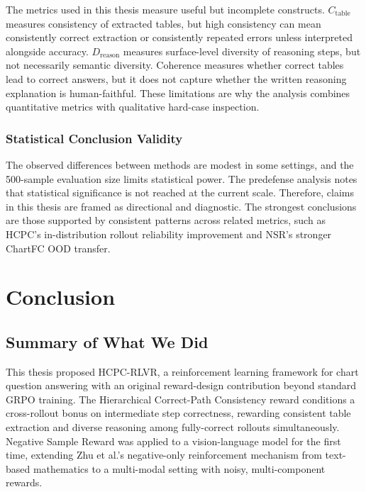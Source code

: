 \documentclass{iutbscthesis}
\begin{document}
The metrics used in this thesis measure useful but incomplete constructs. $C_{\text{table}}$ measures consistency of extracted tables, but high consistency can mean consistently correct extraction or consistently repeated errors unless interpreted alongside accuracy. $D_{\text{reason}}$ measures surface-level diversity of reasoning steps, but not necessarily semantic diversity. Coherence measures whether correct tables lead to correct answers, but it does not capture whether the written reasoning explanation is human-faithful. These limitations are why the analysis combines quantitative metrics with qualitative hard-case inspection.

\subsection{Statistical Conclusion Validity}

The observed differences between methods are modest in some settings, and the 500-sample evaluation size limits statistical power. The predefense analysis notes that statistical significance is not reached at the current scale. Therefore, claims in this thesis are framed as directional and diagnostic. The strongest conclusions are those supported by consistent patterns across related metrics, such as HCPC's in-distribution rollout reliability improvement and NSR's stronger ChartFC OOD transfer.


\chapter{Conclusion} \label{chapter:conclusion}

\section{Summary of What We Did}

This thesis proposed HCPC-RLVR, a reinforcement learning framework for chart question answering with an original reward-design contribution beyond standard GRPO training. The Hierarchical Correct-Path Consistency reward conditions a cross-rollout bonus on intermediate step correctness, rewarding consistent table extraction and diverse reasoning among fully-correct rollouts simultaneously. Negative Sample Reward was applied to a vision-language model for the first time, extending Zhu et al.'s negative-only reinforcement mechanism from text-based mathematics to a multi-modal setting with noisy, multi-component rewards.
\end{document}
